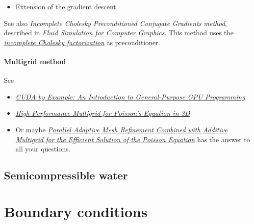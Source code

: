 \begin{itemize}
    \item Extension of the gradient descent
\end{itemize}

See also \textit{Incomplete Cholesky Preconditioned Conjugate Gradients method}, described in \textit{\href{http://www.cs.ubc.ca/~rbridson/fluidbook/}{Fluid Simulation for Computer Graphics}}. This method uses the \textit{\href{http://en.wikipedia.org/wiki/Incomplete_Cholesky_factorization}{incomplete Cholesky factorization}} as preconditioner.

\paragraph{Multigrid method}

See
\begin{itemize}
    \item \textit{\href{http://developer.download.nvidia.com/books/cuda-by-example/cuda-by-example-sample.pdf}{CUDA by Example: An Introduction to General-Purpose GPU Programming}}
    \item \textit{\href{http://people.freebsd.org/~snb/school/hp_mg.pdf}{High Performance Multigrid for Poisson's Equation in 3D}}
    \item Or maybe \textit{\href{http://downloads.isrn.com/journals/appmath/2012/246491.pdf}{Parallel Adaptive Mesh Refinement Combined with Additive Multigrid for the Efficient Solution of the Poisson Equation}} has the answer to all your questions.
\end{itemize}


\subsection{Semicompressible water}

\section{Boundary conditions}